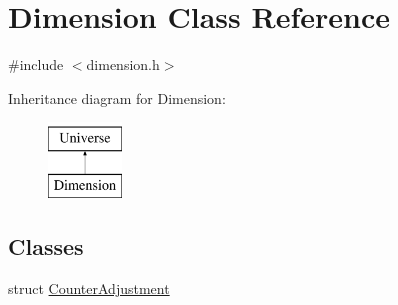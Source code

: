 \hypertarget{classDimension}{}\section{Dimension Class Reference}
\label{classDimension}


{\ttfamily \#include $<$dimension.\+h$>$}

Inheritance diagram for Dimension\+:\begin{figure}[H]
\begin{center}
\leavevmode
\includegraphics[height=2.000000cm]{classDimension}
\end{center}
\end{figure}
\subsection*{Classes}
\begin{DoxyCompactItemize}
\item 
struct \mbox{\hyperlink{structDimension_1_1CounterAdjustment}{Counter\+Adjustment}}
\end{DoxyCompactItemize}
